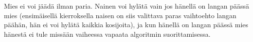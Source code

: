 \documentclass[finnish]{tktltiki2}
\theoremstyle{definition}
\theoremstyle{remark}
\begin{document}
Mies ei voi jäädä ilman paria. Nainen voi hylätä vain jos hänellä on langan päässä mies (ensimäisellä kierroksella naisen on siis valittava paras vaihtoehto langan päähän, hän ei voi hylätä kaikkia kosijoita), ja kun hänellä on langan päässä mies hänestä ei tule missään vaiheessa vapaata algoritmin suorittamisessa. 




%
%
% 
%



\end{document}
